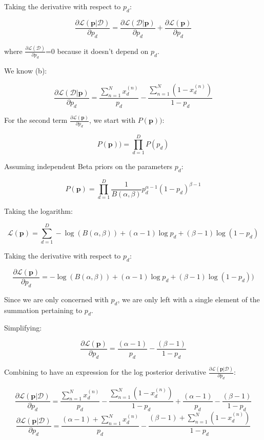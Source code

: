 \documentclass[12pt]{article}
\begin{document}
\begin{enumerate}
Taking the derivative with respect to $p_d$:

$$\frac{\partial\mathcal{L}(\textbf{p}|\mathcal{D})}{\partial p_d} = \frac{\partial\mathcal{L}(\mathcal{D}|\textbf{p})}{\partial p_d} + \frac{\partial\mathcal{L}(\textbf{p})}{\partial p_d}$$

where $\frac{\partial\mathcal{L}(\mathcal{D})}{\partial p_d}$=0 because it doesn't depend on $p_d$.

We know (b):

$$\frac{\partial\mathcal{L}(\mathcal{D}|\textbf{p})}{\partial p_d} = \frac{\sum_{n=1}^{N} x_d^{(n)}}{p_d} -  \frac{\sum_{n=1}^{N} (1-x_d^{(n)})}{1-p_d}$$

For the second term $\frac{\partial\mathcal{L}(\textbf{p})}{\partial p_d}$, we start with $P(\textbf{p}))$:

$$P(\textbf{p})) = \prod_{d=1}^D P(p_d)$$

Assuming independent Beta priors on the parameters $p_d$:

$$P(\textbf{p}) = \prod_{d=1}^D \frac{1}{B(\alpha, \beta)} p^{\alpha-1}_d (1-p_d)^{\beta-1}$$

Taking the logarithm:

$$\mathcal{L}(\textbf{p}) = \sum_{d=1}^{D} -\log (B(\alpha, \beta)) + (\alpha-1)\log p_d + (\beta-1)\log(1-p_d)$$

Taking the derivative with respect to $p_d$:

$$\frac{\partial\mathcal{L}(\textbf{p})}{\partial p_d} = -\log (B(\alpha, \beta)) + (\alpha-1)\log p_d + (\beta-1)\log(1-p_d))$$

Since we are only concerned with $p_d$, we are only left with a single element of the summation pertaining to $p_d$.

Simplifying:

$$\frac{\partial\mathcal{L}(\textbf{p})}{\partial p_d} = \frac{(\alpha-1)}{p_d} -  \frac{(\beta-1)}{1-p_d}$$

Combining to have an expression for the log posterior derivative $\frac{\partial\mathcal{L}(\textbf{p}|\mathcal{D})}{\partial p_d}$:

$$\frac{\partial\mathcal{L}(\textbf{p}|\mathcal{D})}{\partial p_d} = \frac{\sum_{n=1}^{N} x_d^{(n)}}{p_d} -  \frac{\sum_{n=1}^{N} (1-x_d^{(n)})}{1-p_d} + \frac{(\alpha-1)}{p_d} -  \frac{(\beta-1)}{1-p_d}$$
$$\frac{\partial\mathcal{L}(\textbf{p}|\mathcal{D})}{\partial p_d} = \frac{(\alpha-1) + \sum_{n=1}^{N} x_d^{(n)}}{p_d} -  \frac{(\beta-1) + \sum_{n=1}^{N} (1-x_d^{(n)})}{1-p_d}$$



\end{enumerate}
\end{document}
